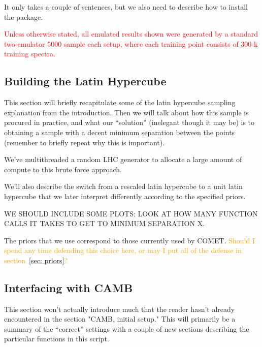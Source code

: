 \documentclass[11pt]{article}
\begin{document}
It only takes a couple of sentences, but we also need to describe how to install the package.

\textcolor{red}{Unless otherwise stated, all emulated results shown were generated by a standard two-emulator 5000 sample each setup, where each training point consists of 300-k training spectra.}

\begin{centering}
\subsection{Building the Latin Hypercube}
\label{sec: build_lhc}
\end{centering}


This section will briefly recapitulate some of the latin hypercube sampling explanation from the introduction. Then we will talk about how this sample is procured in practice, and what our ``solution'' (inelegant though it may be) is to obtaining a sample with a decent minimum separation between the points (remember to briefly repeat why this is important).

We've multithreaded a random LHC generator to allocate a large amount of compute to this brute force approach.

We'll also describe the switch from a rescaled latin hypercube to a unit latin hypercube that we later interpret differently according to the specified priors.

WE SHOULD INCLUDE SOME PLOTS: LOOK AT HOW MANY FUNCTION CALLS IT TAKES TO GET
TO MINIMUM SEPARATION X.


The priors that we use correspond to those currently used by COMET. \textcolor{orange}{Should I spend any time defending this choice here, or may I put all of the defense in section~\ref{sec: priors}?}

\begin{centering}
\subsection{Interfacing with CAMB}
\end{centering}


This section won't actually introduce much that the reader hasn't already encountered in the section "CAMB, initial setup." This will primarily be a summary of the ``correct'' settings with a couple of new sections describing the particular functions in this script.
\end{document}
